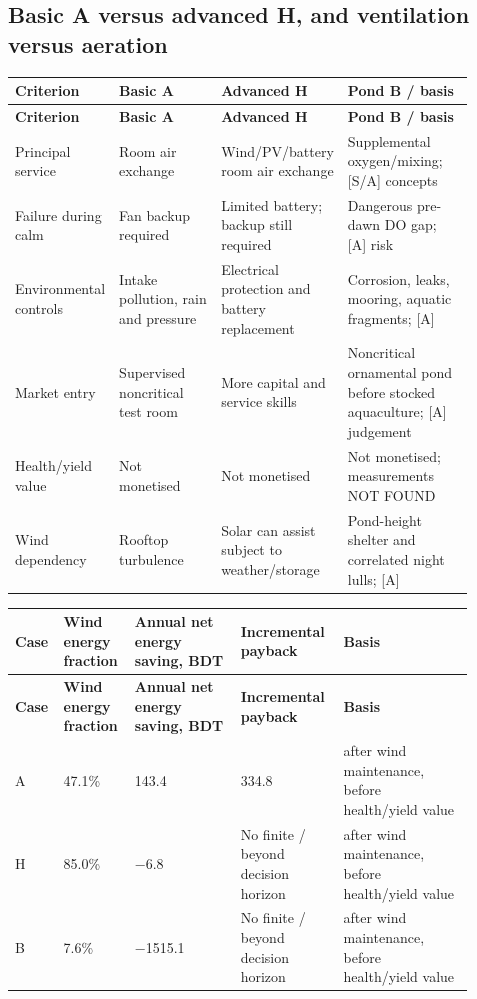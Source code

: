 \documentclass[11pt,a4paper]{article}
\begin{document}
\subsection{Basic A versus advanced H, and ventilation versus aeration}
{\small
\setlength{\tabcolsep}{3pt}\renewcommand{\arraystretch}{1.18}
\begin{longtable}{@{}>{\raggedright\arraybackslash}p{0.1502\linewidth}>{\raggedright\arraybackslash}p{0.2385\linewidth}>{\raggedright\arraybackslash}p{0.2385\linewidth}>{\raggedright\arraybackslash}p{0.2827\linewidth}@{}}
\toprule \textbf{Criterion} & \textbf{Basic A} & \textbf{Advanced H} & \textbf{Pond B / basis} \\ \midrule
\endfirsthead\toprule \textbf{Criterion} & \textbf{Basic A} & \textbf{Advanced H} & \textbf{Pond B / basis} \\ \midrule
\endhead\bottomrule\endfoot
Principal service & Room air exchange & Wind/PV/battery room air exchange & Supplemental oxygen/mixing; [S/A] concepts \\
Failure during calm & Fan backup required & Limited battery; backup still required & Dangerous pre-dawn DO gap; [A] risk \\
Environmental controls & Intake pollution, rain and pressure & Electrical protection and battery replacement & Corrosion, leaks, mooring, aquatic fragments; [A] \\
Market entry & Supervised noncritical test room & More capital and service skills & Noncritical ornamental pond before stocked aquaculture; [A] judgement \\
Health/yield value & Not monetised & Not monetised & Not monetised; measurements NOT FOUND \\
Wind dependency & Rooftop turbulence & Solar can assist subject to weather/storage & Pond-height shelter and correlated night lulls; [A] \\
\end{longtable}}
{\small
\setlength{\tabcolsep}{3pt}\renewcommand{\arraystretch}{1.18}
\begin{longtable}{@{}>{\raggedright\arraybackslash}p{0.0631\linewidth}>{\raggedright\arraybackslash}p{0.1351\linewidth}>{\raggedright\arraybackslash}p{0.2252\linewidth}>{\raggedright\arraybackslash}p{0.2162\linewidth}>{\raggedright\arraybackslash}p{0.2703\linewidth}@{}}
\toprule \textbf{Case} & \textbf{Wind energy fraction} & \textbf{Annual net energy saving, BDT} & \textbf{Incremental payback} & \textbf{Basis} \\ \midrule
\endfirsthead\toprule \textbf{Case} & \textbf{Wind energy fraction} & \textbf{Annual net energy saving, BDT} & \textbf{Incremental payback} & \textbf{Basis} \\ \midrule
\endhead\bottomrule\endfoot
A & \num{47.1}\% & \num{143.4} & \num{334.8} & [D] after wind maintenance, before health/yield value \\
H & \num{85.0}\% & \num{-6.8} & No finite / beyond decision horizon & [D] after wind maintenance, before health/yield value \\
B & \num{7.6}\% & \num{-1515.1} & No finite / beyond decision horizon & [D] after wind maintenance, before health/yield value \\
\end{longtable}}
\end{document}
